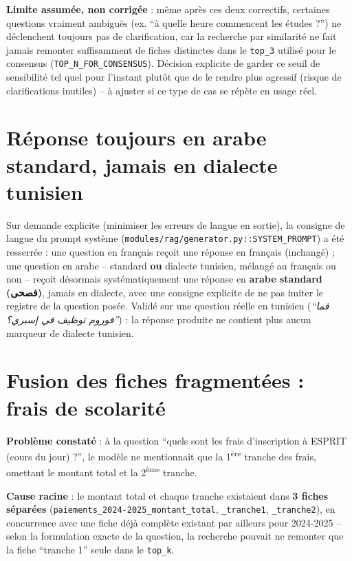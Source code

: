 \documentclass[11pt,a4paper]{report}
\begin{document}
\begin{noteinfo}
\textbf{Limite assumée, non corrigée} : même après ces deux correctifs, certaines
questions vraiment ambiguës (ex. ``à quelle heure commencent les études ?'') ne
déclenchent toujours pas de clarification, car la recherche par similarité ne fait
jamais remonter suffisamment de fiches distinctes dans le \texttt{top\_3} utilisé pour le
consensus (\texttt{TOP\_N\_FOR\_CONSENSUS}). Décision explicite de garder ce seuil de
sensibilité tel quel pour l'instant plutôt que de le rendre plus agressif (risque de
clarifications inutiles) -- à ajuster si ce type de cas se répète en usage réel.
\end{noteinfo}

\section{Réponse toujours en arabe standard, jamais en dialecte tunisien}
Sur demande explicite (minimiser les erreurs de langue en sortie), la consigne de langue
du prompt système (\texttt{modules/rag/generator.py::SYSTEM\_PROMPT}) a été resserrée :
une question en français reçoit une réponse en français (inchangé) ; une question en
arabe -- standard \textbf{ou} dialecte tunisien, mélangé au français ou non -- reçoit
désormais systématiquement une réponse en \textbf{arabe standard (فصحى)}, jamais en
dialecte, avec une consigne explicite de ne pas imiter le registre de la question posée.
Validé sur une question réelle en tunisien (\emph{``فما فوروم توظيف في إسبري؟''}) : la
réponse produite ne contient plus aucun marqueur de dialecte tunisien.

\section{Fusion des fiches fragmentées : frais de scolarité}
\textbf{Problème constaté} : à la question ``quels sont les frais d'inscription à ESPRIT
(cours du jour) ?'', le modèle ne mentionnait que la 1\textsuperscript{ère} tranche des
frais, omettant le montant total et la 2\textsuperscript{ème} tranche.

\textbf{Cause racine} : le montant total et chaque tranche existaient dans \textbf{3
fiches séparées} (\texttt{paiements\_2024-2025\_montant\_total},
\texttt{\_tranche1}, \texttt{\_tranche2}), en concurrence avec une fiche déjà complète
existant par ailleurs pour 2024-2025 -- selon la formulation exacte de la question, la
recherche pouvait ne remonter que la fiche ``tranche 1'' seule dans le \texttt{top\_k}.
\end{document}
